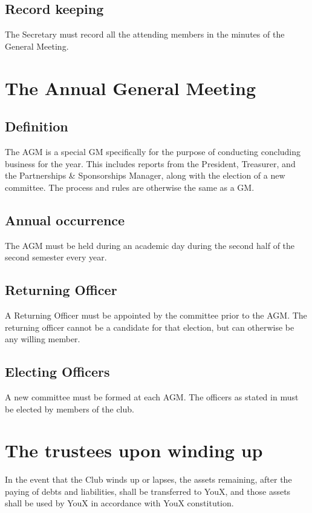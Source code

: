 \documentclass{constitution}
\begin{document}
\subsection{Record keeping}
The Secretary must record all the attending members in the minutes of the General Meeting.

\section{The Annual General Meeting}\label{annualGeneralMeeting}
\subsection{Definition}
The AGM is a special GM specifically for the purpose of conducting concluding business for the year. This includes reports from the President, Treasurer, and the Partnerships \& Sponsorships Manager, along with the election of a new committee. The process and rules are otherwise the same as a GM.

\subsection{Annual occurrence}
The AGM must be held during an academic day during the second half of the second semester every year.

\subsection{Returning Officer}
A Returning Officer must be appointed by the committee prior to the AGM. The returning officer cannot be a candidate for that election, but can otherwise be any willing member.

\subsection{Electing Officers}
A new committee must be formed at each AGM. The officers as stated in  must be elected by members of the club.

\section{The trustees upon winding up}
In the event that the Club winds up or lapses, the assets remaining, after the paying of debts and liabilities, shall be transferred to YouX, and those assets shall be used by YouX in accordance with YouX constitution.
\end{document}
